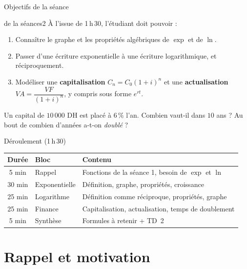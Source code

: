 \documentclass[10pt,aspectratio=169]{beamer}
\numberwithin{dummy}{section}
\begin{document}
\begin{frame}{Objectifs de la séance}
\begin{myobj}{de la séance}{s2}
À l'issue de 1\,h\,30, l'étudiant doit pouvoir :
\end{myobj}
\vspace{-0.4em}
\begin{enumerate}
    \item Connaître le graphe et les propriétés algébriques de $\exp$ et de $\ln$.
    \item Passer d'une écriture exponentielle à une écriture logarithmique, et réciproquement.
    \item Modéliser une \textbf{capitalisation} $C_n=C_0(1+i)^n$ et une \textbf{actualisation}
    $VA=\dfrac{VF}{(1+i)^n}$, y compris sous forme $e^{rt}$.
\end{enumerate}

\vspace{0.35em}
\begin{boxgestion}
Un capital de $10\,000$ DH est placé à $6\,\%$ l'an.
Combien vaut-il dans $10$ ans ? Au bout de combien d'années a-t-on \emph{doublé} ?
\end{boxgestion}
\end{frame}

\begin{frame}{Déroulement (1\,h\,30)}
\renewcommand{\arraystretch}{1.35}
\begin{center}
\begin{tabular}{@{}clp{7.8cm}@{}}
\toprule
\textbf{Durée} & \textbf{Bloc} & \textbf{Contenu} \\
\midrule
5 min  & Rappel & Fonctions de la séance 1, besoin de $\exp$ et $\ln$ \\
30 min & Exponentielle & Définition, graphe, propriétés, croissance \\
25 min & Logarithme & Définition comme réciproque, propriétés, graphe \\
25 min & Finance & Capitalisation, actualisation, temps de doublement \\
5 min  & Synthèse & Formules à retenir + TD~2 \\
\bottomrule
\end{tabular}
\end{center}
\end{frame}


\section{Rappel et motivation}
\end{document}
